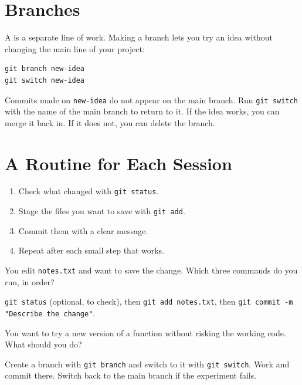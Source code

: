 \section{Branches}
A  is a separate line of work. Making a branch lets you try an
idea without changing the main line of your project:

\begin{verbatim}
git branch new-idea
git switch new-idea
\end{verbatim}

Commits made on \texttt{new-idea} do not appear on the main branch. Run
\texttt{git switch} with the name of the main branch to return to it. If the
idea works, you can merge it back in. If it does not, you can delete the branch.

\section{A Routine for Each Session}
\begin{enumerate}
\item Check what changed with \texttt{git status}.
\item Stage the files you want to save with \texttt{git add}.
\item Commit them with a clear message.
\item Repeat after each small step that works.
\end{enumerate}

\begin{Exercise}[label=vc1, title=Record a change]
You edit \texttt{notes.txt} and want to save the change. Which three commands do
you run, in order?
\end{Exercise}
\begin{Answer}[ref=vc1]
\texttt{git status} (optional, to check), then \texttt{git add notes.txt}, then
\texttt{git commit -m "Describe the change"}.
\end{Answer}

\begin{Exercise}[label=vc2, title=Branch or main?]
You want to try a new version of a function without risking the working code.
What should you do?
\end{Exercise}
\begin{Answer}[ref=vc2]
Create a branch with \texttt{git branch} and switch to it with \texttt{git switch}.
Work and commit there. Switch back to the main branch if the experiment fails.
\end{Answer}
